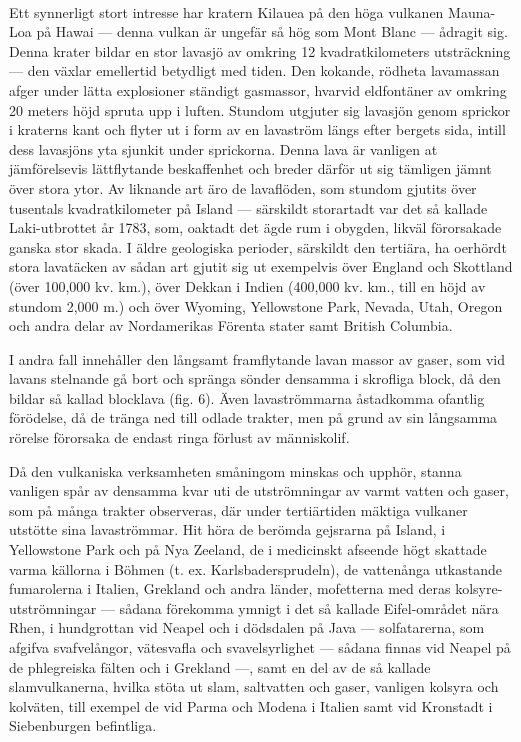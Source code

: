 \documentclass[a4paper, 12pt, oneside, swedish]{article}
\begin{document}
\paragraph{}
Ett synnerligt stort intresse har kratern Kilauea på den höga vulkanen Mauna-Loa på Hawai --- denna vulkan är ungefär så hög som Mont Blanc --- ådragit sig. Denna krater bildar en stor lavasjö av omkring 12 kvadratkilometers utsträckning --- den växlar emellertid betydligt med tiden. Den kokande, rödheta lavamassan afger under lätta explosioner ständigt gasmassor, hvarvid eldfontäner av omkring 20 meters höjd spruta upp i luften. Stundom utgjuter sig lavasjön genom sprickor i kraterns kant och flyter ut i form av en lavaström längs efter bergets sida, intill dess lavasjöns yta sjunkit under sprickorna. Denna lava är vanligen at jämförelsevis lättflytande beskaffenhet och breder därför ut sig tämligen jämnt över stora ytor. Av liknande art äro de lavaflöden, som stundom gjutits över tusentals kvadratkilometer på Island --- särskildt storartadt var det så kallade Laki-utbrottet år 1783, som, oaktadt det ägde rum i obygden, likväl förorsakade ganska stor skada. I äldre geologiska perioder, särskildt den tertiära, ha oerhördt stora lavatäcken av sådan art gjutit sig ut exempelvis över England och Skottland (över 100,000 kv. km.), över Dekkan i Indien (400,000 kv. km., till en höjd av stundom 2,000 m.) och över Wyoming, Yellowstone Park, Nevada, Utah, Oregon och andra delar av Nordamerikas Förenta stater samt British Columbia.

I andra fall innehåller den långsamt framflytande lavan massor av gaser, som vid lavans stelnande gå bort och spränga sönder densamma i skrofliga block, då den bildar så kallad blocklava (fig. 6). Även lavaströmmarna åstadkomma ofantlig förödelse, då de tränga ned till odlade trakter, men på grund av sin långsamma rörelse förorsaka de endast ringa förlust av människolif.

Då den vulkaniska verksamheten småningom minskas och upphör, stanna vanligen spår av densamma kvar uti de utströmningar av varmt vatten och gaser, som på många trakter observeras, där under tertiärtiden mäktiga vulkaner utstötte sina lavaströmmar. Hit höra de berömda gejsrarna på Island, i Yellowstone Park och på Nya Zeeland, de i medicinskt afseende högt skattade varma källorna i Böhmen (t. ex. Karlsbadersprudeln), de vattenånga utkastande fumarolerna i Italien, Grekland och andra länder, mofetterna med deras kolsyre-utströmningar --- sådana förekomma ymnigt i det så kallade Eifel-området nära Rhen, i hundgrottan vid Neapel och i dödsdalen på Java --- solfatarerna, som afgifva svafvelångor, vätesvafla och svavelsyrlighet --- sådana finnas vid Neapel på de phlegreiska fälten och i Grekland ---, samt en del av de så kallade slamvulkanerna, hvilka stöta ut slam, saltvatten och gaser, vanligen kolsyra och kolväten, till exempel de vid Parma och Modena i Italien samt vid Kronstadt i Siebenburgen befintliga.
\end{document}
